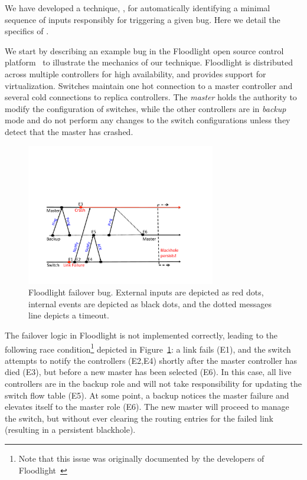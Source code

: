 
We have developed a technique, \simulator, for automatically identifying
a minimal sequence of inputs responsibly for triggering a given
bug. Here we detail the specifics
of \simulator.

We start by describing an example bug in the Floodlight
open source control platform~\cite{floodlight_bug} to illustrate the mechanics
of our technique. Floodlight is distributed across
multiple controllers for high availability, and provides support for
virtualization. Switches maintain one hot connection to a master controller and
several cold connections to replica controllers. The \emph{master} holds the
authority to modify the configuration of switches, while the other
controllers are in \emph{backup} mode and do not perform any changes to the
switch configurations unless they detect that the master has crashed.

\begin{figure}[t]
    \includegraphics[width=3.25in]{../diagrams/case_study/example_bug.pdf}
    \caption[]{\label{fig:example} Floodlight failover bug. External inputs
               are depicted as red dots, internal events are depicted as black
               dots, and the dotted messages line depicts a timeout.}
\end{figure}

The failover logic in Floodlight is not implemented correctly, leading to the
following race condition\footnote{Note that this issue was
originally documented by the developers of Floodlight~\cite{floodlight_bug}} depicted in
Figure~\ref{fig:example}:
a link fails (E1), and the switch attempts to notify the controllers (E2,E4) shortly after the master
controller has died (E3), but before a new master has been selected (E6). In this case, all live controllers are in
the backup role and will not take responsibility for updating the switch
flow table (E5). At some point, a backup notices the master failure and
elevates itself to the master role (E6). The new master will proceed to manage
the switch, but without ever clearing the routing entries for
the failed link (resulting in a persistent blackhole).

